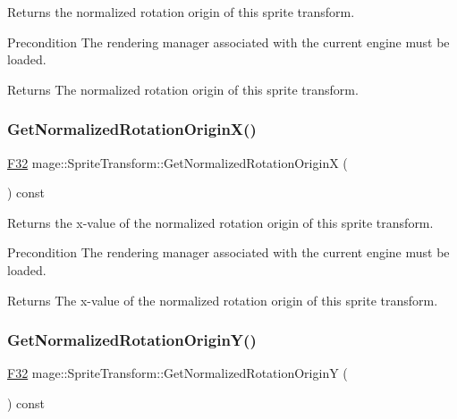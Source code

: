 Returns the normalized rotation origin of this sprite transform.

\begin{DoxyPrecond}{Precondition}
The rendering manager associated with the current engine must be loaded. 
\end{DoxyPrecond}
\begin{DoxyReturn}{Returns}
The normalized rotation origin of this sprite transform. 
\end{DoxyReturn}
\hypertarget{classmage_1_1_sprite_transform_a44a0577d7c136650027da9f5b8a6be77}{}\label{classmage_1_1_sprite_transform_a44a0577d7c136650027da9f5b8a6be77} 
\subsubsection{\texorpdfstring{Get\+Normalized\+Rotation\+Origin\+X()}{GetNormalizedRotationOriginX()}}
{\footnotesize\ttfamily \hyperlink{namespacemage_aa97e833b45f06d60a0a9c4fc22ae02c0}{F32} mage\+::\+Sprite\+Transform\+::\+Get\+Normalized\+Rotation\+OriginX (\begin{DoxyParamCaption}{ }\end{DoxyParamCaption}) const}

Returns the x-\/value of the normalized rotation origin of this sprite transform.

\begin{DoxyPrecond}{Precondition}
The rendering manager associated with the current engine must be loaded. 
\end{DoxyPrecond}
\begin{DoxyReturn}{Returns}
The x-\/value of the normalized rotation origin of this sprite transform. 
\end{DoxyReturn}
\hypertarget{classmage_1_1_sprite_transform_afc002a5d0357c2dc638cc166904446d1}{}\label{classmage_1_1_sprite_transform_afc002a5d0357c2dc638cc166904446d1} 
\subsubsection{\texorpdfstring{Get\+Normalized\+Rotation\+Origin\+Y()}{GetNormalizedRotationOriginY()}}
{\footnotesize\ttfamily \hyperlink{namespacemage_aa97e833b45f06d60a0a9c4fc22ae02c0}{F32} mage\+::\+Sprite\+Transform\+::\+Get\+Normalized\+Rotation\+OriginY (\begin{DoxyParamCaption}{ }\end{DoxyParamCaption}) const}

